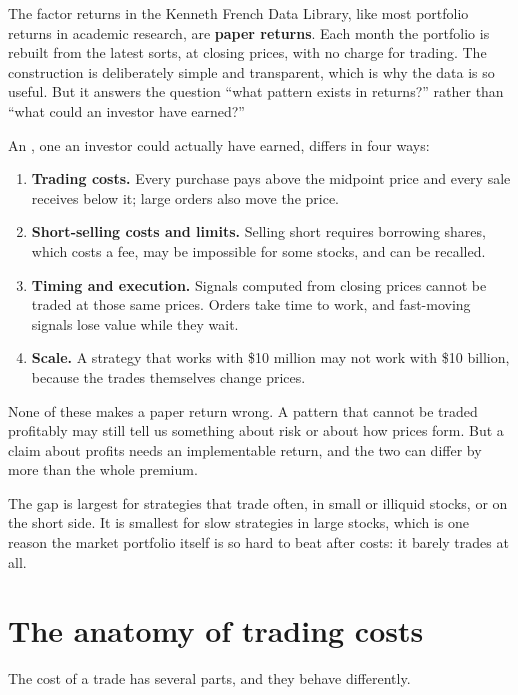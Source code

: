The factor returns in the Kenneth French Data Library, like most portfolio returns in academic research, are \textbf{paper returns}. Each month the portfolio is rebuilt from the latest sorts, at closing prices, with no charge for trading. The construction is deliberately simple and transparent, which is why the data is so useful. But it answers the question ``what pattern exists in returns?'' rather than ``what could an investor have earned?''

An , one an investor could actually have earned, differs in four ways:

\begin{enumerate}
  \item \textbf{Trading costs.} Every purchase pays above the midpoint price and every sale receives below it; large orders also move the price.
  \item \textbf{Short-selling costs and limits.} Selling short requires borrowing shares, which costs a fee, may be impossible for some stocks, and can be recalled.
  \item \textbf{Timing and execution.} Signals computed from closing prices cannot be traded at those same prices. Orders take time to work, and fast-moving signals lose value while they wait.
  \item \textbf{Scale.} A strategy that works with \$10 million may not work with \$10 billion, because the trades themselves change prices.
\end{enumerate}

None of these makes a paper return wrong. A pattern that cannot be traded profitably may still tell us something about risk or about how prices form. But a claim about profits needs an implementable return, and the two can differ by more than the whole premium.

The gap is largest for strategies that trade often, in small or illiquid stocks, or on the short side. It is smallest for slow strategies in large stocks, which is one reason the market portfolio itself is so hard to beat after costs: it barely trades at all.

\section{The anatomy of trading costs}
\label{sec:17-anatomy}

The cost of a trade has several parts, and they behave differently.

